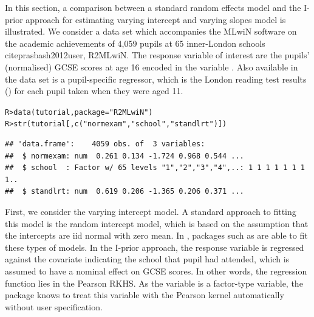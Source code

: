 \documentclass[a4paper,showframe,11pt]{report}\usepackage[]{graphicx}\usepackage[]{color}
\makeatletter
\newcommand{\hlstr}[1]{\textcolor[rgb]{0.063,0.58,0.627}{#1}}%
\newcommand{\hlstd}[1]{\textcolor[rgb]{0.196,0.196,0.196}{#1}}%
\newcommand{\hlkwc}[1]{\textcolor[rgb]{0,0.631,0.314}{#1}}%
\newcommand{\hlkwd}[1]{\textcolor[rgb]{0.78,0.227,0.412}{#1}}%
\newenvironment{kframe}{%
 \def\at@end@of@kframe{}%
 \ifinner\ifhmode%
  \def\at@end@of@kframe{\end{minipage}}%
  \begin{minipage}{\columnwidth}%
 \fi\fi%
 \def\FrameCommand##1{\hskip\@totalleftmargin \hskip-\fboxsep
 \colorbox{shadecolor}{##1}\hskip-\fboxsep
     \hskip-\linewidth \hskip-\@totalleftmargin \hskip\columnwidth}%
 \MakeFramed {\advance\hsize-\width
   \@totalleftmargin\z@ \linewidth\hsize
   \@setminipage}}%
 {\par\unskip\endMakeFramed%
 \at@end@of@kframe}
\newenvironment{knitrout}{}{} %
\makeatother
\begin{document}
In this section, a comparison between a standard random effects model and the I-prior approach for estimating varying intercept and varying slopes model is illustrated. We consider a data set which accompanies the MLwiN software on the academic achievements of 4,059 pupils at 65 inner-London schools citep{rasbash2012user, R2MLwiN}. The response variable of interest are the pupils' (normalised) GCSE scores at age 16 encoded in the variable . Also available in the data set is a pupil-specific regressor, which is the London reading test results () for each pupil taken when they were aged 11.

\begin{knitrout}
\color{fgcolor}\begin{kframe}
\begin{alltt}
\hlstd{R> }\hlkwd{data}\hlstd{(tutorial,} \hlkwc{package} \hlstd{=} \hlstr{"R2MLwiN"}\hlstd{)}
\hlstd{R> }\hlkwd{str}\hlstd{(tutorial[,} \hlkwd{c}\hlstd{(}\hlstr{"normexam"}\hlstd{,} \hlstr{"school"}\hlstd{,} \hlstr{"standlrt"}\hlstd{)])}
\end{alltt}
\begin{verbatim}
## 'data.frame':	4059 obs. of  3 variables:
##  $ normexam: num  0.261 0.134 -1.724 0.968 0.544 ...
##  $ school  : Factor w/ 65 levels "1","2","3","4",..: 1 1 1 1 1 1 1 1..
##  $ standlrt: num  0.619 0.206 -1.365 0.206 0.371 ...
\end{verbatim}
\end{kframe}
\end{knitrout}


First, we consider the varying intercept model. A standard approach to fitting this model is the random intercept model, which is based on the assumption that the intercepts are iid normal with zero mean. In , packages such as  are able to fit these types of models. In the I-prior approach, the response variable  is regressed against the covariate  indicating the school that pupil had attended, which is assumed to have a nominal effect on GCSE scores. In other words, the regression function lies in the Pearson RKHS. As the variable  is a factor-type variable, the  package knows to treat this variable with the Pearson kernel automatically without user specification.
\end{document}
